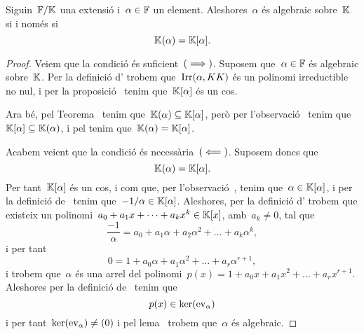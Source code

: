 \documentclass[../Apunts.tex]{subfiles}
\begin{document}
	\begin{lemma}
		\label{lema:un element és algebraic si i només si el mínim subanell engendrat per l'element és un cos}
		Siguin~\(\mathbb{F}/\mathbb{K}\) una extensió i~\(\alpha\in\mathbb{F}\) un element. Aleshores~\(\alpha\) és algebraic sobre~\(\mathbb{K}\) si i només si
		\[\mathbb{K}(\alpha)=\mathbb{K}[\alpha].\]
		\begin{proof} %
			Veiem que la condició és suficient~\((\implies)\). Suposem que~\(\alpha\in\mathbb{F}\) és algebraic sobre~\(\mathbb{K}\). Per la definició d' trobem que~\(\operatorname{Irr}(\alpha,KK)\) és un polinomi irreductible no nul, i per la proposició~ tenim que~\(\mathbb{K}[\alpha]\) és un cos.
			
			Ara bé, pel Teorema~ tenim que~\(\mathbb{K}(\alpha)\subseteq\mathbb{K}[\alpha]\), però per l'observació~ tenim que~\(\mathbb{K}[\alpha]\subseteq\mathbb{K}(\alpha)\), i pel  tenim que~\(\mathbb{K}(\alpha)=\mathbb{K}[\alpha]\).
			
			Acabem veient que la condició és necessària~\((\impliedby)\). Suposem doncs que
			\[\mathbb{K}(\alpha)=\mathbb{K}[\alpha].\]
			Per tant~\(\mathbb{K}[\alpha]\) és un cos, i com que, per l'observació~, tenim que~\(\alpha\in\mathbb{K}[\alpha]\), i per la definició de~ tenim que~\(-1/\alpha\in\mathbb{K}[\alpha]\). Aleshores, per la definició d' trobem que existeix un polinomi~\(a_{0}+a_{1}x+\dots+a_{k}x^{k}\in\mathbb{K}[x]\), amb~\(a_{k}\neq0\), tal que
			\[\frac{-1}{\alpha}=a_{0}+a_{1}\alpha+a_{2}\alpha^{2}+\dots+a_{k}\alpha^{k},\]
			i per tant
			\[0=1+a_{0}\alpha+a_{1}\alpha^{2}+\dots+a_{r}\alpha^{r+1},\]
			i trobem que~\(\alpha\) és una arrel del polinomi~\(p(x)=1+a_{0}x+a_{1}x^{2}+\dots+a_{r}x^{r+1}\). Aleshores per la definició de~ tenim que
			\[p(x)\in\operatorname{ker}(\mathrm{ev}_{\alpha})\]
			i per tant~\(\operatorname{ker}(\mathrm{ev}_{\alpha})\neq(0)\) i pel lema~ trobem que~\(\alpha\) és algebraic.
		\end{proof}
	\end{lemma}
\end{document}

